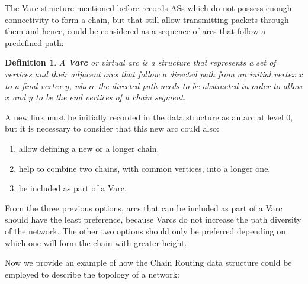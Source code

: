 \documentclass[5p,twocolumn]{elsarticle}
\newtheorem{definition}{Definition}
\begin{document}
The Varc structure mentioned before records ASs which do not possess enough connectivity to form a chain, but that still allow transmitting packets through them and hence, could be considered as a sequence of arcs that follow a predefined path:

\begin{definition}\label{D:david_69}
A \textbf{Varc} or virtual arc is a structure that represents a set of vertices and their adjacent arcs that follow a directed path from an initial vertex $x$ to a final vertex $y$, where the directed path needs to be abstracted in order to allow $x$ and $y$ to be the end vertices of a chain segment.
\end{definition}

A new link must be initially recorded in the data structure as an arc at level 0, but it is necessary to consider that this new arc could also:

\begin{enumerate}
	\item allow defining a new or a longer chain.
	\item help to combine two chains, with common vertices, into a longer one.
	\item be included as part of a Varc.
\end{enumerate}

From the three previous options, arcs that can be included as part of a Varc should have the least preference, because Varcs do not increase the path diversity of the network. The other two options should only be preferred depending on which one will form the chain with greater height.

Now we provide an example of how the Chain Routing data structure could be employed to describe the topology of a network:
\end{document}
